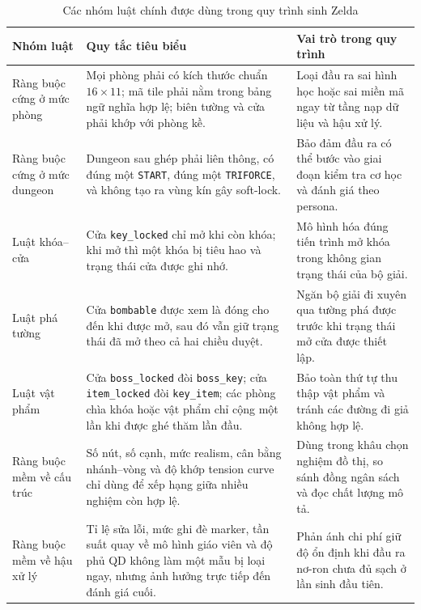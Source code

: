 \documentclass[oneside,a4paper,12pt]{extreport}
\begin{document}
\begin{table}[H]
\centering
\small
\caption{Các nhóm luật chính được dùng trong quy trình sinh Zelda}
\label{tab:hard_soft_game_rules}
\begin{tabular}{>{\raggedright\arraybackslash}p{2.8cm} >{\raggedright\arraybackslash}p{6.0cm} >{\raggedright\arraybackslash}p{5.0cm}}
\toprule
Nhóm luật & Quy tắc tiêu biểu & Vai trò trong quy trình \\
\midrule
Ràng buộc cứng ở mức phòng & Mọi phòng phải có kích thước chuẩn $16\times 11$; mã tile phải nằm trong bảng ngữ nghĩa hợp lệ; biên tường và cửa phải khớp với phòng kề. & Loại đầu ra sai hình học hoặc sai miền mã ngay từ tầng nạp dữ liệu và hậu xử lý. \\
Ràng buộc cứng ở mức dungeon & Dungeon sau ghép phải liên thông, có đúng một \texttt{START}, đúng một \texttt{TRIFORCE}, và không tạo ra vùng kín gây soft-lock. & Bảo đảm đầu ra có thể bước vào giai đoạn kiểm tra cơ học và đánh giá theo persona. \\
Luật khóa--cửa & Cửa \texttt{key\_locked} chỉ mở khi còn khóa; khi mở thì một khóa bị tiêu hao và trạng thái cửa được ghi nhớ. & Mô hình hóa đúng tiến trình mở khóa trong không gian trạng thái của bộ giải. \\
Luật phá tường & Cửa \texttt{bombable} được xem là đóng cho đến khi được mở, sau đó vẫn giữ trạng thái đã mở theo cả hai chiều duyệt. & Ngăn bộ giải đi xuyên qua tường phá được trước khi trạng thái mở cửa được thiết lập. \\
Luật vật phẩm & Cửa \texttt{boss\_locked} đòi \texttt{boss\_key}; cửa \texttt{item\_locked} đòi \texttt{key\_item}; các phòng chìa khóa hoặc vật phẩm chỉ cộng một lần khi được ghé thăm lần đầu. & Bảo toàn thứ tự thu thập vật phẩm và tránh các đường đi giả không hợp lệ. \\
Ràng buộc mềm về cấu trúc & Số nút, số cạnh, mức realism, cân bằng nhánh--vòng và độ khớp tension curve chỉ dùng để xếp hạng giữa nhiều nghiệm còn hợp lệ. & Dùng trong khâu chọn nghiệm đồ thị, so sánh đồng ngân sách và đọc chất lượng mô tả. \\
Ràng buộc mềm về hậu xử lý & Tỉ lệ sửa lỗi, mức ghi đè marker, tần suất quay về mô hình giáo viên và độ phủ QD không làm một mẫu bị loại ngay, nhưng ảnh hưởng trực tiếp đến đánh giá cuối. & Phản ánh chi phí giữ độ ổn định khi đầu ra nơ-ron chưa đủ sạch ở lần sinh đầu tiên. \\
\bottomrule
\end{tabular}
\end{table}
\end{document}
